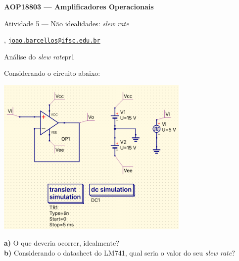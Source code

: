 



\usepackage[style=numeric, citestyle=ieee]{biblatex}




\begin{Large}
    \textbf{AOP18803 --- Amplificadores Operacionais}
    
    Atividade 5 --- Não idealidades: \textit{slew rate} \hfill {}
\end{Large}

\vspace{1ex}
\textbf{} , \href{mailto:joao.barcellos@ifsc.edu.br}{\texttt{joao.barcellos@ifsc.edu.br}}\\
\textbf{}

\vspace{2ex}

\begin{problem}{Análise do \textit{slew rate}}{pr1}

Considerando o circuito abaixo: \\
    
\begin{center}
    \includegraphics[width=0.7\textwidth]{./figures/slew_rate.png}
\end{center}

\textbf{a)} O que deveria ocorrer, idealmente? \\

\textbf{b)} Considerando o datasheet do LM741, qual seria o valor do seu \textit{slew rate}? \\

\end{problem}

